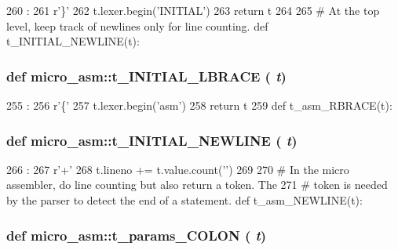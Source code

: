 \begin{DoxyCode}
260                    :
261     r'\}'
262     t.lexer.begin('INITIAL')
263     return t
264 
265 # At the top level, keep track of newlines only for line counting.
def t_INITIAL_NEWLINE(t):
\end{DoxyCode}
\hypertarget{namespacemicro__asm_aa2c06c393c224afce043356650406e53}{
\subsubsection[{t\_\-INITIAL\_\-LBRACE}]{\setlength{\rightskip}{0pt plus 5cm}def micro\_\-asm::t\_\-INITIAL\_\-LBRACE ( {\em t})}}
\label{namespacemicro__asm_aa2c06c393c224afce043356650406e53}



\begin{DoxyCode}
255                        :
256     r'\{'
257     t.lexer.begin('asm')
258     return t
259 
def t_asm_RBRACE(t):
\end{DoxyCode}
\hypertarget{namespacemicro__asm_a01568e4c45abbf86a0d13ed07b788a73}{
\subsubsection[{t\_\-INITIAL\_\-NEWLINE}]{\setlength{\rightskip}{0pt plus 5cm}def micro\_\-asm::t\_\-INITIAL\_\-NEWLINE ( {\em t})}}
\label{namespacemicro__asm_a01568e4c45abbf86a0d13ed07b788a73}



\begin{DoxyCode}
266                         :
267     r'\n+'
268     t.lineno += t.value.count('\n')
269 
270 # In the micro assembler, do line counting but also return a token. The
271 # token is needed by the parser to detect the end of a statement.
def t_asm_NEWLINE(t):
\end{DoxyCode}
\hypertarget{namespacemicro__asm_a3848d5690974e3ec07f038ea017bf8bc}{
\subsubsection[{t\_\-params\_\-COLON}]{\setlength{\rightskip}{0pt plus 5cm}def micro\_\-asm::t\_\-params\_\-COLON ( {\em t})}}
\label{namespacemicro__asm_a3848d5690974e3ec07f038ea017bf8bc}



